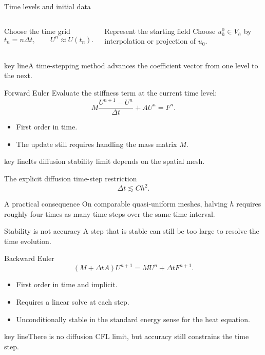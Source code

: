 \documentclass[aspectratio=169,11pt]{beamer}
\newcommand{\key}[1]{\par\vspace{4mm}\begin{beamercolorbox}[sep=2.5mm,wd=\textwidth]{key line}\normalsize #1\end{beamercolorbox}}
\begin{document}
\begin{frame}{Time levels and initial data}
\begin{columns}[c,onlytextwidth]
\begin{block}{Choose the time grid}
\[
t_n=n\Delta t,\qquad U^n\approx U(t_n).
\]
\end{block}
\begin{exampleblock}{Represent the starting field}
Choose $u_h^0\in V_h$ by interpolation or projection of $u_0$.
\end{exampleblock}
\end{columns}\key{A time-stepping method advances the coefficient vector from one level to the next.}
\end{frame}

\begin{frame}{Forward Euler}
Evaluate the stiffness term at the current time level:\[
\boxed{M\frac{U^{n+1}-U^n}{\Delta t}+AU^n=F^n.}
\]\begin{itemize}
\item First order in time.
\item The update still requires handling the mass matrix $M$.
\end{itemize}\key{Its diffusion stability limit depends on the spatial mesh.}
\end{frame}

\begin{frame}{The explicit diffusion time-step restriction}
\[
\Delta t\lesssim C h^2.
\]\begin{exampleblock}{A practical consequence}
On comparable quasi-uniform meshes, halving $h$ requires roughly four times as many time steps over the same time interval.
\end{exampleblock}\begin{alertblock}{Stability is not accuracy}
A step that is stable can still be too large to resolve the time evolution.
\end{alertblock}
\end{frame}

\begin{frame}{Backward Euler}
\[
\boxed{(M+\Delta t A)U^{n+1}=MU^n+\Delta t F^{n+1}.}
\]\begin{itemize}
\item First order in time and implicit.
\item Requires a linear solve at each step.
\item Unconditionally stable in the standard energy sense for the heat equation.
\end{itemize}\key{There is no diffusion CFL limit, but accuracy still constrains the time step.}
\end{frame}
\end{document}
